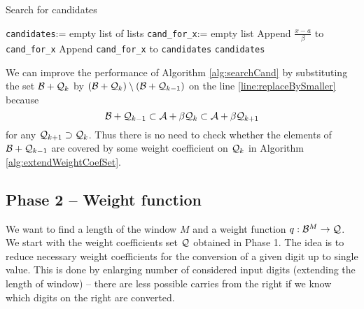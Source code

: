 \begin{algorithm}
  \caption{Search for candidates}
    \label{alg:searchCand}
  \begin{algorithmic}[1]
    \STATE \verb+candidates+:= empty list of lists
     \label{line:replaceBySmaller}
      \STATE \verb+cand_for_x+:= empty list
              \STATE Append $\frac{x-a}{\beta}$ to \verb+cand_for_x+
            \ENDIF
      \ENDFOR 
      \STATE Append \verb+cand_for_x+ to \verb+candidates+
  \ENDFOR
  \RETURN \verb+candidates+
  \end{algorithmic}
\end{algorithm}  

We can improve the performance of Algorithm \ref{alg:searchCand} by substituting the set $\mathcal{B} + \mathcal{Q}_{k}$ by $(\mathcal{B} + \mathcal{Q}_{k})\setminus (\mathcal{B} + \mathcal{Q}_{k-1})$ on the line \ref{line:replaceBySmaller} because
$$
\mathcal{B} + \mathcal{Q}_{k-1} \subset \mathcal{A} + \beta \mathcal{Q}_{k} \subset \mathcal{A} + \beta \mathcal{Q}_{k+1}
$$
for any $\mathcal{Q}_{k+1} \supset \mathcal{Q}_{k}$. Thus there is no need to check whether the elements of $\mathcal{B} + \mathcal{Q}_{k-1}$ are covered by some weight coefficient on $\mathcal{Q}_k$ in Algorithm \ref{alg:extendWeightCoefSet}.



    

  
    
    





\subsection{Phase 2 -- Weight function}
\label{subsec:phase2}
    We want to find a length of the window $M$ and a weight function $q:\mathcal{B}^{M} \to \mathcal{Q}$. We start with the weight coefficients set $\mathcal{Q}$ obtained in Phase 1. The idea is to reduce necessary weight coefficients for the conversion of a given digit up to single value. This is done by enlarging number of considered input digits (extending the length of window) -- there are less possible carries from the right if we know which digits on the right are converted. 
     
